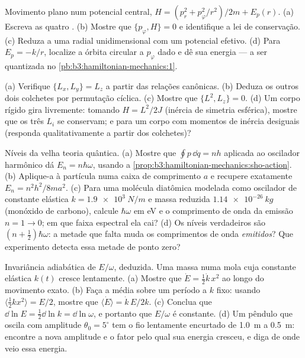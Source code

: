 \begin{exercise}[$\star\star$]\label{exo:b3:hamiltonian-mechanics:8}
Movimento plano num potencial central, $H = (p_r^2 + p_\varphi^2/r^2)/2m
+ E_p(r)$. (a) Escreva as quatro . (b) Mostre que $\{
p_\varphi, H\} = 0$ e identifique a lei de conservação. (c) Reduza a
uma  radial unidimensional com um potencial efetivo. (d)
Para $E_p = -k/r$, localize a órbita circular a $p_\varphi$ dado e dê
sua energia --- a ser quantizada no
\cref{pb:b3:hamiltonian-mechanics:1}.
\end{exercise}

\begin{exercise}[$\star\star$]\label{exo:b3:hamiltonian-mechanics:9}
(a) Verifique $\{L_x, L_y\} = L_z$ a partir das relações canônicas. (b)
Deduza os outros dois colchetes por permutação cíclica. (c) Mostre que
$\{L^2, L_z\} = 0$. (d) Um corpo rígido gira livremente: tomando $H =
L^2/2J$ (inércia de simetria esférica), mostre que os três $L_i$ se
conservam; e para um corpo com momentos de inércia desiguais (responda
qualitativamente a partir dos colchetes)?
\end{exercise}

\begin{exercise}[$\star\star\star$]\label{exo:b3:hamiltonian-mechanics:10}
Níveis da velha teoria quântica. (a) Mostre que $\oint p\,\dd q = nh$
aplicada ao oscilador harmônico dá $E_n = n\hbar\omega$, usando a
\cref{prop:b3:hamiltonian-mechanics:sho-action}. (b) Aplique-a à
partícula numa caixa de comprimento $a$ e recupere exatamente $E_n =
n^2h^2/8ma^2$. (c) Para uma molécula diatômica modelada como oscilador
de constante elástica $k = \qty{1.9e3}{N/m}$ e massa reduzida $\qty{1.14e-26}
{kg}$ (monóxido de carbono), calcule $\hbar\omega$ em eV e o
comprimento de onda da emissão $n = 1 \to 0$; em que faixa espectral
ela cai? (d) Os níveis verdadeiros são $(n + \tfrac12)\hbar\omega$: a
metade que falta muda os comprimentos de onda \emph{emitidos}? Que
experimento detecta essa metade de ponto zero?
\end{exercise}

\begin{exercise}[$\star\star\star$]\label{exo:b3:hamiltonian-mechanics:11}
Invariância adiabática de $E/\omega$, deduzida. Uma massa numa mola
cuja constante elástica $k(t)$ cresce lentamente. (a) Mostre que $\dot E = \tfrac12\dot k\,
x^2$ ao longo do movimento exato. (b) Faça a média sobre um período a
$k$ fixo: usando $\langle\tfrac12 kx^2\rangle = E/2$, mostre que $\langle\dot E\rangle
= \dot k\,E/2k$. (c) Conclua que $\dd\ln E = \tfrac12\dd\ln k = \dd\ln
\omega$, e portanto que $E/\omega$ é constante. (d) Um pêndulo que
oscila com amplitude $\theta_0 = 5^\circ$ tem o fio lentamente
encurtado de \qty{1.0}{m} a \qty{0.5}{m}: encontre a nova amplitude e o
fator pelo qual sua energia cresceu, e diga de onde veio essa energia.
\end{exercise}

